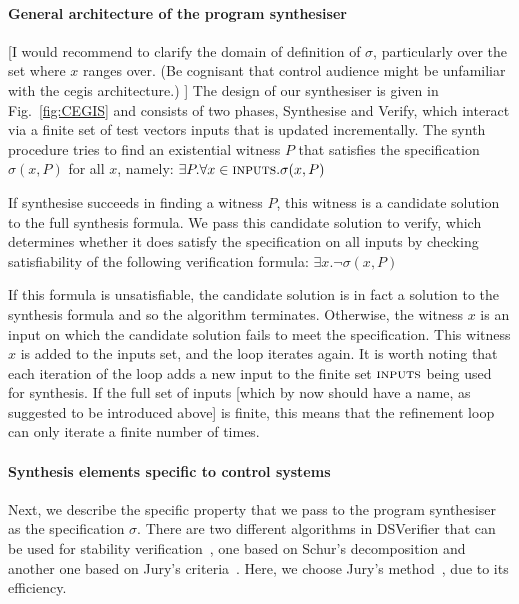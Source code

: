 \documentclass{sig-alternate-05-2015}
\newcommand{\blue}[1]{{\color{blue}#1}}
\newcommand{\red}[1]{{\color{red}#1}}
\begin{document}

\paragraph{General architecture of the program synthesiser}
%
\red{[I would recommend to clarify the domain of definition of $\sigma$, particularly over the set where $x$ ranges over. 
(Be cognisant that control audience might be unfamiliar with the cegis architecture.) ]}
% 
The design of our synthesiser is given in
Fig.~\ref{fig:CEGIS} and consists of two phases, {\sc
Synthesise} and {\sc Verify}, which interact via a finite set of test vectors {\sc inputs} \blue{that is updated incrementally}.
The {\sc synth} procedure tries to find an existential witness $P$
that satisfies the specification $\sigma(x, P)$ for all $x$, namely:
%
$\exists P . \forall x \in \text{\sc inputs} . \sigma(x, P)$

If {\sc synthesise} succeeds in finding a witness $P$, this witness is a
candidate solution to the full synthesis formula.  We pass this candidate
solution to {\sc verify}, which determines whether it does satisfy
the specification on all inputs by checking satisfiability of the following 
verification formula:
%
$\exists x . \lnot \sigma(x, P)$

If this formula is unsatisfiable, the candidate solution is in fact a
solution to the synthesis formula and so the algorithm terminates. 
Otherwise, the witness $x$ is an input on which the candidate solution fails
to meet the specification.  This witness $x$ is added to the {\sc inputs}
set, and the loop iterates again.  It is worth noting that each iteration of the
loop adds a new input to the \red{finite} set $\text{\sc inputs}$  being used for synthesis.  If
the full set of inputs \blue{[which by now should have a name, as suggested to be introduced above]} is finite, this means that the refinement loop
can only iterate a finite number of times.

\paragraph{Synthesis elements specific to control systems}
Next, we describe the specific property that we pass to the 
program synthesiser as the specification $\sigma$.
There are two different algorithms in DSVerifier that can be used for
stability verification~\cite{DBLP:journals/dafes/BessaICF16}, 
one based on Schur's decomposition and another one based on 
Jury's criteria~\cite{astrom1997computer}.
Here, we choose Jury's method~\cite{astrom1997computer}, due to its efficiency.
\end{document}
